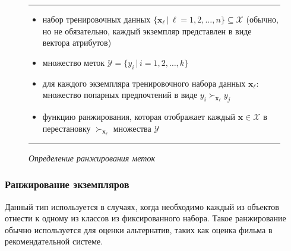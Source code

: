 		\begin{figure}[h]
			\hrule
			\begin{description}[nosep]
				\item[Дано:] \null\leavevmode
				\begin{itemize}[itemsep=0pt,leftmargin=2ex,label=\textbf{---}]
					\item набор тренировочных данных $\{\bm{x}_\ell \, | \, \ell = 1,2,\dotsc,n\} \subseteq \mathcal{X} $ (обычно, но не обязательно, каждый экземпляр представлен в виде вектора атрибутов)
					\item множество меток $\mathcal{Y} = \{y_i\,|\,i = 1,2,\dotsc,k\}$
					\item для каждого экземпляра тренировочного набора данных $\bm{x}_\ell$: множество попарных предпочтений в виде $y_i \succ_{\bm{x}_\ell} y_j $
				\end{itemize}
				\item[Найти:] \null\leavevmode
				\begin{itemize}[itemsep=0pt,leftmargin=2ex,label=\textbf{---}]
					\item функцию ранжирования, которая отображает каждый $\bm{x} \in \mathcal{X}$ в перестановку $\succ_{\bm{x}_\ell}$ множества $\mathcal{Y}$
				\end{itemize}
			\end{description} 
			\hrule
			\caption{\it Определение ранжирования меток \cite[Рис.~1]{plbook:Introduction:2010}}
			\label{fig:label_ranking}
		\end{figure}
	
	\subsubsection{Ранжирование экземпляров}
		Данный тип используется в случаях, когда необходимо каждый из объектов отнести к одному из классов из фиксированного набора. Такое ранжирование обычно используется для оценки альтернатив, таких как оценка фильма в рекомендательной системе.
		
